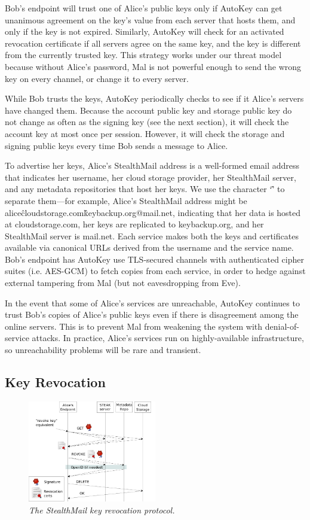 Bob's endpoint will trust one of Alice's public keys only if AutoKey can get unanimous agreement on the key's value from each server that hosts them, and only if the key is not expired.  Similarly, AutoKey will check for an activated revocation certificate if all servers agree on the same key, and the key is different from the currently trusted key.  This strategy works under our threat model because without Alice's password, Mal is not powerful enough to send the wrong key on every channel, or change it to every server.

While Bob trusts the keys, AutoKey periodically checks to see if it Alice's servers have changed them.  Because the account public key and storage public key do not change as often as the signing key (see the next section), it will check the account key at most once per session.  However, it will check the storage and signing public keys every time Bob sends a message to Alice.

To advertise her keys, Alice's StealthMail address is a well-formed email address that indicates her username, her cloud storage provider, her StealthMail server, and any metadata repositories that host her keys.  We use the character ‘\^’ to separate them---for example, Alice's StealthMail address might be alice\^cloudstorage.com\^keybackup.org@mail.net, indicating that her data is hosted at cloudstorage.com, her keys are replicated to keybackup.org, and her StealthMail server is mail.net.  Each service makes both the keys and certificates available via canonical URLs derived from the username and the service name.  Bob's endpoint has AutoKey use TLS-secured channels with authenticated cipher suites (i.e. AES-GCM) to fetch copies from each service, in order to hedge against external tampering from Mal (but not eavesdropping from Eve).

In the event that some of Alice's services are unreachable, AutoKey continues to trust Bob's copies of Alice's public keys even if there is disagreement among the online servers.  This is to prevent Mal from weakening the system with denial-of-service attacks.  In practice, Alice's services run on highly-available infrastructure, so unreachability problems will be rare and transient.

\subsection{Key Revocation}


\begin{figure}[h!]
\centering
\includegraphics[width=0.5\textwidth]{figures/revoke}
\caption{\it The StealthMail key revocation protocol.}
\label{fig:revoke}
\end{figure}

